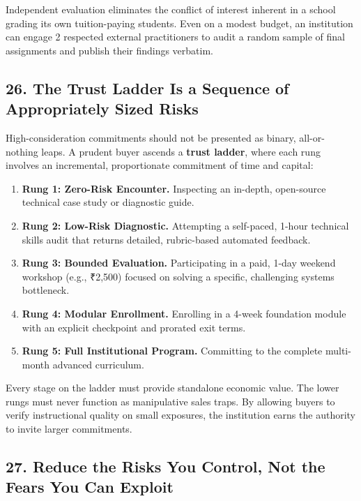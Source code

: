 Independent evaluation eliminates the conflict of interest inherent in a school grading its own tuition-paying students. Even on a modest budget, an institution can engage 2 respected external practitioners to audit a random sample of final assignments and publish their findings verbatim.

\subsection*{26. The Trust Ladder Is a Sequence of Appropriately Sized Risks}

High-consideration commitments should not be presented as binary, all-or-nothing leaps. A prudent buyer ascends a \textbf{trust ladder}, where each rung involves an incremental, proportionate commitment of time and capital:
\begin{enumerate}
\item \textbf{Rung 1: Zero-Risk Encounter.} Inspecting an in-depth, open-source technical case study or diagnostic guide.
\item \textbf{Rung 2: Low-Risk Diagnostic.} Attempting a self-paced, 1-hour technical skills audit that returns detailed, rubric-based automated feedback.
\item \textbf{Rung 3: Bounded Evaluation.} Participating in a paid, 1-day weekend workshop (e.g., ₹2,500) focused on solving a specific, challenging systems bottleneck.
\item \textbf{Rung 4: Modular Enrollment.} Enrolling in a 4-week foundation module with an explicit checkpoint and prorated exit terms.
\item \textbf{Rung 5: Full Institutional Program.} Committing to the complete multi-month advanced curriculum.
\end{enumerate}

Every stage on the ladder must provide standalone economic value. The lower rungs must never function as manipulative sales traps. By allowing buyers to verify instructional quality on small exposures, the institution earns the authority to invite larger commitments.

\subsection*{27. Reduce the Risks You Control, Not the Fears You Can Exploit}

